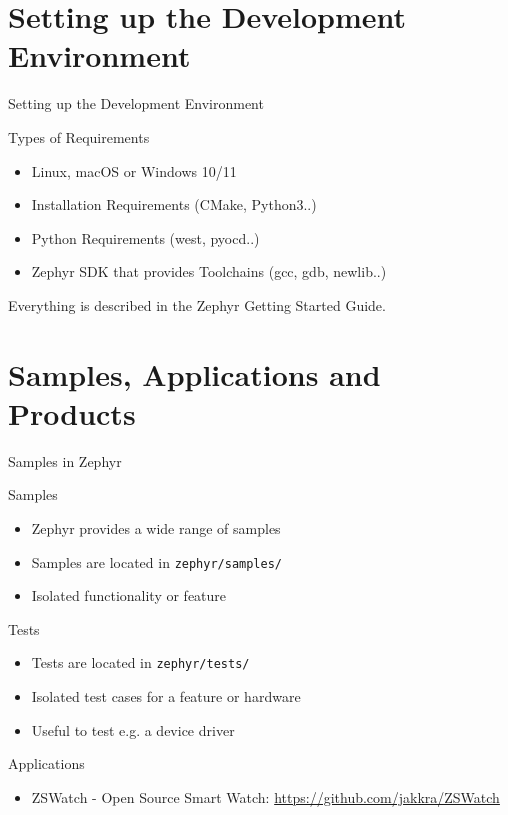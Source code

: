 \documentclass[10pt, aspectratio=169]{beamer}
\begin{document}
\section{Setting up the Development Environment}

\begin{frame}[fragile]{Setting up the Development Environment}

  \begin{block}{Types of Requirements}
    \begin{itemize}
      \item Linux, macOS or Windows 10/11
      \item Installation Requirements (CMake, Python3..)
      \item Python Requirements (west, pyocd..)
      \item Zephyr SDK that provides Toolchains (gcc, gdb, newlib..)
    \end{itemize}
  \end{block}
  Everything is described in the Zephyr Getting Started Guide.
\end{frame}

\section{Samples, Applications and Products}

\begin{frame}[fragile]{Samples in Zephyr}

  \begin{block}{Samples}
    \begin{itemize}
      \item Zephyr provides a wide range of samples
      \item Samples are located in \texttt{zephyr/samples/}
      \item Isolated functionality or feature
    \end{itemize}
  \end{block}
  \begin{block}{Tests}
    \begin{itemize}
      \item Tests are located in \texttt{zephyr/tests/}
      \item Isolated test cases for a feature or hardware
      \item Useful to test e.g. a device driver
    \end{itemize}
  \end{block}
  \begin{block}{Applications}
    \begin{itemize}
      \item ZSWatch - Open Source Smart Watch: {\scriptsize \url{https://github.com/jakkra/ZSWatch}}
    \end{itemize}
  \end{block}
\end{frame}
\end{document}
